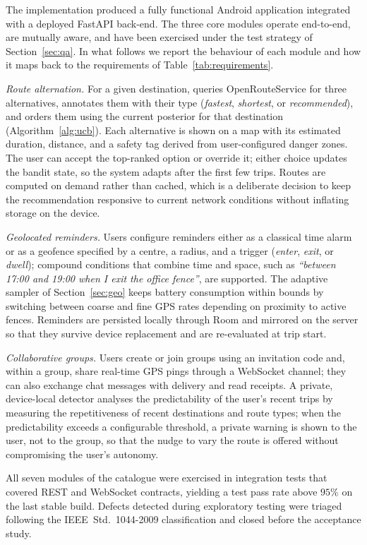 \documentclass[a4paper,fleqn]{cas-sc}
\begin{document}
	The implementation produced a fully functional Android application integrated with a deployed FastAPI back-end. The three core modules operate end-to-end, are mutually aware, and have been exercised under the test strategy of Section~\ref{sec:qa}. In what follows we report the behaviour of each module and how it maps back to the requirements of Table~\ref{tab:requirements}.
	
	\emph{Route alternation.} For a given destination, \RUTAI{} queries OpenRouteService for three alternatives, annotates them with their type (\emph{fastest}, \emph{shortest}, or \emph{recommended}), and orders them using the current \UCB{} posterior for that destination (Algorithm~\ref{alg:ucb}). Each alternative is shown on a map with its estimated duration, distance, and a safety tag derived from user-configured danger zones. The user can accept the top-ranked option or override it; either choice updates the bandit state, so the system adapts after the first few trips. Routes are computed on demand rather than cached, which is a deliberate decision to keep the recommendation responsive to current network conditions without inflating storage on the device.
	
	\emph{Geolocated reminders.} Users configure reminders either as a classical time alarm or as a geofence specified by a centre, a radius, and a trigger (\emph{enter}, \emph{exit}, or \emph{dwell}); compound conditions that combine time and space, such as \emph{``between 17:00 and 19:00 when I exit the office fence''}, are supported. The adaptive sampler of Section~\ref{sec:geo} keeps battery consumption within bounds by switching between coarse and fine GPS rates depending on proximity to active fences. Reminders are persisted locally through Room and mirrored on the server so that they survive device replacement and are re-evaluated at trip start.
	
	\emph{Collaborative groups.} Users create or join groups using an invitation code and, within a group, share real-time GPS pings through a WebSocket channel; they can also exchange chat messages with delivery and read receipts. A private, device-local detector analyses the predictability of the user's recent trips by measuring the repetitiveness of recent destinations and route types; when the predictability exceeds a configurable threshold, a private warning is shown to the user, not to the group, so that the nudge to vary the route is offered without compromising the user's autonomy.
	
	All seven modules of the catalogue were exercised in integration tests that covered REST and WebSocket contracts, yielding a test pass rate above $95\%$ on the last stable build. Defects detected during exploratory testing were triaged following the IEEE~Std.~1044-2009 classification and closed before the acceptance study.
	
\end{document}
